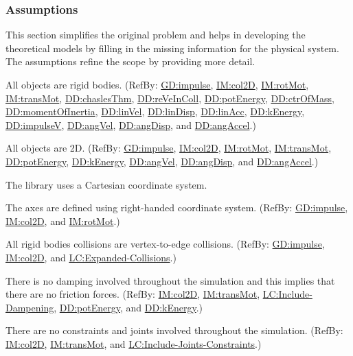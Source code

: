 \documentclass[12pt]{article}
\begin{document}
\subsubsection{Assumptions}
\label{Sec:Assumps}
This section simplifies the original problem and helps in developing the theoretical models by filling in the missing information for the physical system. The assumptions refine the scope by providing more detail.

\begin{description}[font=\normalfont]
\item[objectTy:\phantomsection\label{assumpOT}]{All objects are rigid bodies. (RefBy: \hyperref[GD:impulse]{GD:impulse}, \hyperref[IM:col2D]{IM:col2D}, \hyperref[IM:rotMot]{IM:rotMot}, \hyperref[IM:transMot]{IM:transMot}, \hyperref[DD:chaslesThm]{DD:chaslesThm}, \hyperref[DD:reVeInColl]{DD:reVeInColl}, \hyperref[DD:potEnergy]{DD:potEnergy}, \hyperref[DD:ctrOfMass]{DD:ctrOfMass}, \hyperref[DD:momentOfInertia]{DD:momentOfInertia}, \hyperref[DD:linVel]{DD:linVel}, \hyperref[DD:linDisp]{DD:linDisp}, \hyperref[DD:linAcc]{DD:linAcc}, \hyperref[DD:kEnergy]{DD:kEnergy}, \hyperref[DD:impulseV]{DD:impulseV}, \hyperref[DD:angVel]{DD:angVel}, \hyperref[DD:angDisp]{DD:angDisp}, and \hyperref[DD:angAccel]{DD:angAccel}.)}
\item[objectDimension:\phantomsection\label{assumpOD}]{All objects are 2D. (RefBy: \hyperref[GD:impulse]{GD:impulse}, \hyperref[IM:col2D]{IM:col2D}, \hyperref[IM:rotMot]{IM:rotMot}, \hyperref[IM:transMot]{IM:transMot}, \hyperref[DD:potEnergy]{DD:potEnergy}, \hyperref[DD:kEnergy]{DD:kEnergy}, \hyperref[DD:angVel]{DD:angVel}, \hyperref[DD:angDisp]{DD:angDisp}, and \hyperref[DD:angAccel]{DD:angAccel}.)}
\item[coordinateSystemTy:\phantomsection\label{assumpCST}]{The library uses a Cartesian coordinate system.}
\item[axesDefined:\phantomsection\label{assumpAD}]{The axes are defined using right-handed coordinate system. (RefBy: \hyperref[GD:impulse]{GD:impulse}, \hyperref[IM:col2D]{IM:col2D}, and \hyperref[IM:rotMot]{IM:rotMot}.)}
\item[collisionType:\phantomsection\label{assumpCT}]{All rigid bodies collisions are vertex-to-edge collisions. (RefBy: \hyperref[GD:impulse]{GD:impulse}, \hyperref[IM:col2D]{IM:col2D}, and \hyperref[lcEC]{LC:Expanded-Collisions}.)}
\item[dampingInvolvement:\phantomsection\label{assumpDI}]{There is no damping involved throughout the simulation and this implies that there are no friction forces. (RefBy: \hyperref[IM:col2D]{IM:col2D}, \hyperref[IM:transMot]{IM:transMot}, \hyperref[lcID]{LC:Include-Dampening}, \hyperref[DD:potEnergy]{DD:potEnergy}, and \hyperref[DD:kEnergy]{DD:kEnergy}.)}
\item[constraintsAndJointsInvolvement:\phantomsection\label{assumpCAJI}]{There are no constraints and joints involved throughout the simulation. (RefBy: \hyperref[IM:col2D]{IM:col2D}, \hyperref[IM:transMot]{IM:transMot}, and \hyperref[lcIJC]{LC:Include-Joints-Constraints}.)}
\end{description}
\end{document}
